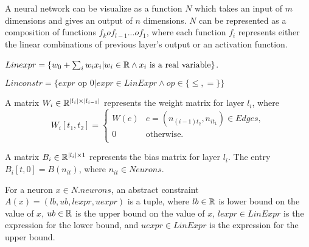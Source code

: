 A neural network can be visualize as a function $N$ which takes an input of $m$ dimensions and gives an 
output of $n$ dimensions. $N$ can be represented as a composition of functions $f_k o f_{l-1} ... o f_1$,
where each function $f_i$ represents either the linear combinations of previous layer's
output or an activation function. 



\begin{df}
    \label{def:linexpr}
    $Linexpr = \{ w_0 + \sum_{i} w_i x_i | w_i \in \mathbb{R} \land x_i \text{ is a real variable} \}$.
\end{df}
  
\begin{df}
    \label{def:linconstr}
    $Linconstr = \{expr \text{ op } 0 | expr \in LinExpr \land op \in \{\leq, = \}\}$
\end{df}






\begin{df}
  A matrix $W_i \in \mathbb{R}^{|l_i|\times|l_{i-1}|}$ represents the weight matrix for layer $l_i$, where  
    $$
    W_i[t_1, t_2] = 
    \begin{cases}
      W(e) & e=(n_{(i-1)t_2}, n_{it_1}) \in Edges,\\
      0 & \text{otherwise.}\\
    \end{cases}
    $$
\end{df}

\begin{df}
    A matrix $B_i \in \mathbb{R}^{|l_i|\times 1}$ represents the bias matrix for layer $l_i$. The entry $B_i[t,0] = B(n_{it})$, where $n_{it} \in Neurons$. 
\end{df}

\begin{df}
    For a neuron $x \in N.neurons$,
    an abstract constraint $A(x) = (lb,ub, lexpr, uexpr)$ is a tuple, where
    $lb \in \mathbb{R}$ is lower bound on the value of $x$,
    $ub \in \mathbb{R}$ is the upper bound on the value of  $x$,
    $lexpr \in LinExpr$ is the expression for the lower bound, and
    $uexpr \in LinExpr$ is the expression for the upper bound.
\end{df}

